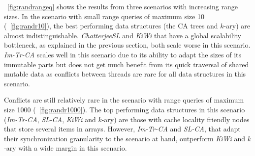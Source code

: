 \documentclass[a4paper,UKenglish]{oasics-v2016}
\newcommand{\kary}{\mbox{$k$-ary}\xspace}
\begin{document}
\figurename~\ref{fig:randrangeq} shows the results from three scenarios with increasing range sizes.
In the scenario with small range queries of maximum size 10 (\figurename~\ref{fig:randr10}), the best performing data structures (the CA trees and \kary{}) are almost indistinguishable.
\emph{ChatterjeeSL} and \emph{KiWi} that have a global scalability bottleneck, as explained in the previous section, both scale worse in this scenario.
\emph{Im-Tr-CA} scales well in this scenario due to its ability to adapt the sizes of its immutable parts but does not get much benefit from its quick traversal of shared mutable data as conflicts between threads are rare for all data structures in this scenario. %

Conflicts are still relatively rare in the scenario with range queries of maximum size 1000 (\figurename~\ref{fig:randr1000}).
The top performing data structures in this scenario (\emph{Im-Tr-CA}, \emph{SL-CA}, \emph{KiWi} and \kary{}) are those with cache locality friendly nodes that store several items in arrays.
However, \emph{Im-Tr-CA} and \emph{SL-CA}, that adapt their synchronization granularity to the scenario at hand, outperform \emph{KiWi} and \kary{} with a wide margin in this scenario.
\end{document}
